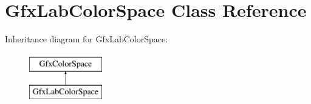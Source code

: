 \hypertarget{class_gfx_lab_color_space}{}\section{Gfx\+Lab\+Color\+Space Class Reference}
\label{class_gfx_lab_color_space}
Inheritance diagram for Gfx\+Lab\+Color\+Space\+:\begin{figure}[H]
\begin{center}
\leavevmode
\includegraphics[height=2.000000cm]{class_gfx_lab_color_space}
\end{center}
\end{figure}
